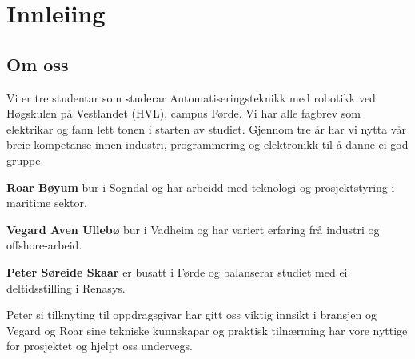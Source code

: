 \chapter{Innleiing}
\thispagestyle{fancy}

\section{Om oss}
Vi er tre studentar som studerar Automatiseringsteknikk med robotikk ved Høgskulen på Vestlandet (\gls{HVL}), campus Førde.
Vi har alle fagbrev som elektrikar og fann lett tonen i starten av studiet. \newline
Gjennom tre år har vi nytta vår breie kompetanse innen industri, programmering og elektronikk
til å danne ei god gruppe.

\textbf{Roar Bøyum} bur i Sogndal og har arbeidd med teknologi og prosjektstyring i maritime sektor.

\textbf{Vegard Aven Ullebø} bur i Vadheim og har variert erfaring frå industri og offshore-arbeid. 

\textbf{Peter Søreide Skaar} er busatt i Førde og balanserar studiet med ei deltidsstilling i Renasys. 

Peter si tilknyting til oppdragsgivar har gitt oss viktig innsikt i bransjen og 
Vegard og Roar sine tekniske kunnskapar og praktisk tilnærming har vore nyttige for prosjektet og hjelpt oss undervegs.


\newpage


